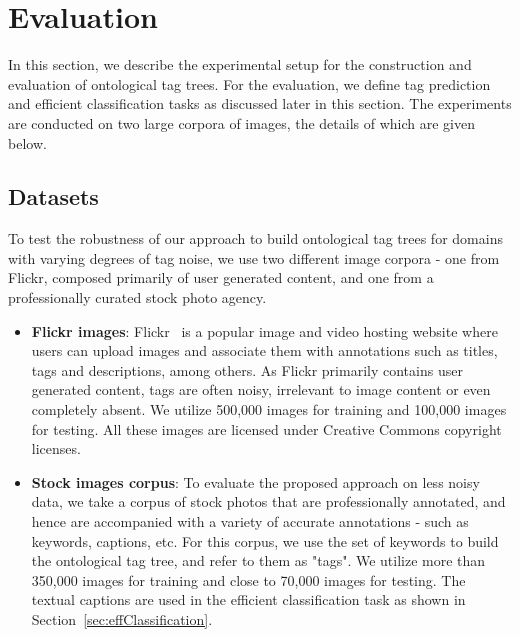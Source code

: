 \section{Evaluation} 
\label{sec:Expts}
In this section, we describe the experimental setup for the construction and evaluation of ontological tag trees. For the evaluation, we define tag prediction and efficient classification tasks as discussed later in this section. The experiments are conducted on two large corpora of images, the details of which are given below.  
\vspace{-0.1in}
\subsection{Datasets} 
\label{sec:Datasets}
To test the robustness of our approach to build ontological tag trees for domains with varying degrees of tag noise, we use two different image corpora - one from Flickr, composed primarily of user generated content, and one from a professionally curated stock photo agency.
\begin{itemize} 
\item \textbf{Flickr images}: Flickr~\cite{Flickr} is a popular image and video hosting website where users can upload images and associate them with annotations such as titles, tags and descriptions, among others. As Flickr primarily contains user generated content, tags are often noisy, irrelevant to image content or even completely absent. 
We utilize 500,000 images for training and 100,000 images for testing. All these images are licensed under Creative Commons copyright licenses.
\item \textbf{Stock images corpus}: To evaluate the proposed approach on less noisy data, we take a corpus of stock photos that are professionally annotated, and hence are accompanied with a variety of accurate annotations - such as keywords, captions, etc. For this corpus, we use the set of keywords to build the ontological tag tree, and refer to them as "tags".
We utilize more than 350,000 images for training and close to 70,000 images for testing. The textual captions are used in the efficient classification task as shown in Section~\ref{sec:effClassification}.
\end{itemize} 

